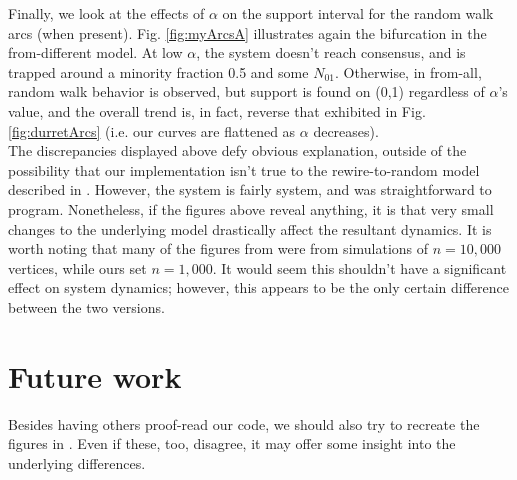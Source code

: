 \documentclass[11pt]{article}
\begin{document}
Finally, we look at the effects of $\alpha$ on the support interval for the random walk arcs (when present). Fig. \ref{fig:myArcsA} illustrates again the bifurcation in the from-different model. At low $\alpha$, the system doesn't reach consensus, and is trapped around a minority fraction 0.5 and some $N_{01}$. Otherwise, in from-all, random walk behavior is observed, but support is found on (0,1) regardless of $\alpha$'s value, and the overall trend is, in fact, reverse that exhibited in Fig. \ref{fig:durretArcs} (i.e. our curves are flattened as $\alpha$ decreases).\\
The discrepancies displayed above defy obvious explanation, outside of the possibility that our implementation isn't true to the rewire-to-random model described in \cite{durret:pnas12}. However, the system is fairly system, and was straightforward to program. Nonetheless, if the figures above reveal anything, it is that very small changes to the underlying model drastically affect the resultant dynamics. It is worth noting that many of the figures from \cite{durret:pnas12} were from simulations of $n=10,000$ vertices, while ours set $n=1,000$. It would seem this shouldn't have a significant effect on system dynamics; however, this appears to be the only certain difference between the two versions.

\section*{Future work}
Besides having others proof-read our code, we should also try to recreate the figures in \cite{vazquez:prl08}. Even if these, too, disagree, it may offer some insight into the underlying differences.



\end{document}
